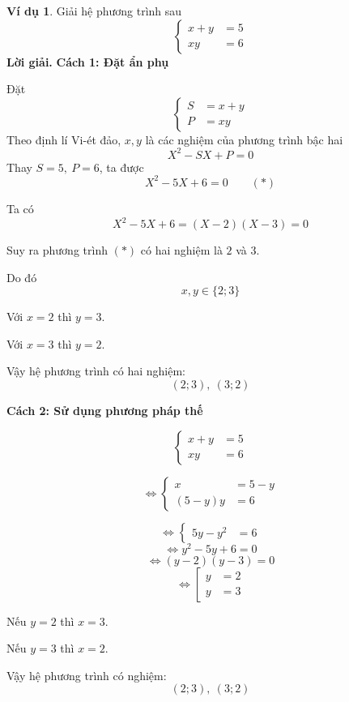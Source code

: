 \documentclass[12pt,a4paper,oneside]{book}
\theoremstyle{theorem}
\theoremstyle{definition}
\newtheorem{vd}[theorem2]{Ví dụ}
\begin{document}
\begin{vd}
    Giải hệ phương trình sau
     \begin{equation} \left\{ \begin{aligned} x+y &= 5\\ xy &= 6 \end{aligned} \right. \end{equation}
\bigskip
\textbf{Lời giải.}
\medskip
\textbf{Cách 1: Đặt ẩn phụ}

Đặt
\[
\left\{
\begin{aligned}
S&=x+y\\
P&=xy
\end{aligned}
\right.
\]
Theo định lí Vi-ét đảo, \(x,y\) là các nghiệm của phương trình bậc hai
\[X^2-SX+P=0
\]
Thay \(S=5,\ P=6\), ta được
\[
X^2-5X+6=0 \qquad (*)
\]

Ta có
\[
X^2-5X+6=(X-2)(X-3)=0
\]

Suy ra phương trình \((*)\) có hai nghiệm là \(2\) và \(3\).

Do đó
\[
x,y\in\{2;3\}
\]

Với \(x=2\) thì \(y=3\).

Với \(x=3\) thì \(y=2\).

Vậy hệ phương trình có hai nghiệm:
\[
(2;3),\ (3;2)
\]

\bigskip

\textbf{Cách 2: Sử dụng phương pháp thế}

\[
\left\{
\begin{aligned}
x+y&=5\\
xy&=6
\end{aligned}
\right.
\]

\[
\Leftrightarrow
\left\{
\begin{aligned}
x&=5-y\\
(5-y)y&=6
\end{aligned}
\right.
\]

\[
\Leftrightarrow
\left\{
\begin{aligned}
5y-y^2&=6
\end{aligned}
\right.
\]
\[
\Leftrightarrow
y^2-5y+6=0
\]
\[
\Leftrightarrow
(y-2)(y-3)=0
\]
\[
\Leftrightarrow
\left[
\begin{aligned}
y&=2\\
y&=3
\end{aligned}
\right.
\]

Nếu \(y=2\) thì \(x=3\).

Nếu \(y=3\) thì \(x=2\).

Vậy hệ phương trình có nghiệm:
\[
(2;3),\ (3;2)
\]
\end{vd}
\end{document}
